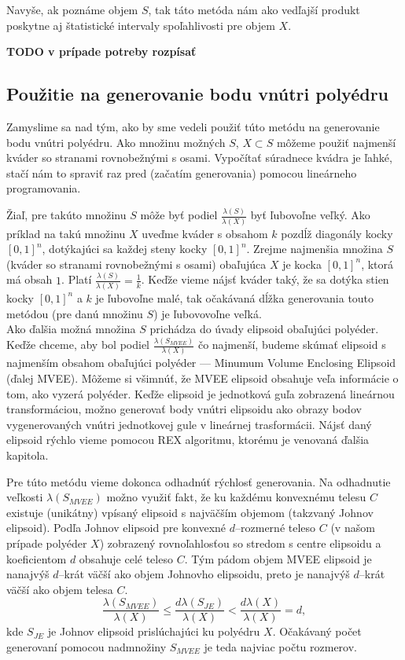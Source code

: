 Navyše, ak poznáme objem $S$, tak táto metóda nám ako vedľajší produkt poskytne aj štatistické intervaly spoľahlivosti pre objem $X$.

\textbf{TODO v prípade potreby rozpísať}

\subsection{Použitie na generovanie bodu vnútri polyédru}

Zamyslime sa nad tým, ako by sme vedeli použiť túto metódu na generovanie bodu vnútri polyédru. Ako množinu možných $S$, $X \subset S$ môžeme použiť najmenší kváder so stranami rovnobežnými s osami. Vypočítať súradnece kvádra je ľahké, stačí nám to spraviť raz pred (začatím generovania) pomocou lineárneho programovania.

Žiaľ, pre takúto množinu $S$ môže byť podiel $\frac{\lambda(S)}{\lambda(X)}$ byť ľubovoľne veľký. Ako príklad na takú množinu $X$ uveďme kváder s obsahom $k$ pozdĺž diagonály kocky $[0,1]^n$, dotýkajúci sa každej steny kocky $[0,1]^n$. Zrejme najmenšia množina $S$ (kváder so stranami rovnobežnými s osami) obaľujúca $X$ je kocka $[0,1]^n$, ktorá má obsah $1$. Platí $\frac{\lambda(S)}{\lambda(X)}=\frac{1}{k}$. Keďže vieme nájsť kváder taký, že sa dotýka stien kocky $[0,1]^n$ a $k$ je ľubovoľne malé, tak očakávaná dĺžka generovania touto metódou (pre danú množinu $S$) je ľubovovoľne veľká.\\

Ako ďalšia možná množina $S$ prichádza do úvady elipsoid obaľujúci polyéder. Keďže chceme, aby bol podiel $\frac{\lambda(S_{MVEE})}{\lambda(X)}$ čo najmenší, budeme skúmať elipsoid s najmenším obsahom obaľujúci polyéder --- Minumum Volume Enclosing Elipsoid (ďalej MVEE). Môžeme si všimnúť, že MVEE elipsoid obsahuje veľa informácie o tom, ako vyzerá polyéder. Keďže elipsoid je jednotková guľa zobrazená lineárnou transformáciou, možno generovať body vnútri elipsoidu ako obrazy bodov vygenerovaných vnútri jednotkovej gule v lineárnej trasformácii. Nájsť daný elipsoid rýchlo vieme pomocou REX algoritmu, ktorému je venovaná ďalšia kapitola.

Pre túto metódu vieme dokonca odhadnúť rýchlosť generovania. Na odhadnutie veľkosti $\lambda(S_{MVEE})$ možno využiť fakt, že ku každému konvexnému telesu $C$ existuje (unikátny) vpísaný elipsoid s najväčším objemom (takzvaný Johnov elipsoid). Podľa \cite{ellipsoids_ball} Johnov elipsoid pre konvexné $d$--rozmerné teleso $C$ (v našom prípade polyéder $X$) zobrazený rovnoľahlosťou so stredom s centre elipsoidu a koeficientom $d$ obsahuje celé teleso $C$. Tým pádom objem MVEE elipsoid je nanajvýš $d$--krát väčší ako objem Johnovho elipsoidu, preto je nanajvýš $d$--krát väčší ako objem telesa $C$.
$$\frac {\lambda(S_{MVEE})}{\lambda(X)} \leq \frac{d\lambda(S_{JE})}{\lambda(X)} < \frac{d\lambda(X)}{\lambda(X)}=d,$$ kde $S_{JE}$ je Johnov elipsoid prislúchajúci ku polyédru $X$. Očakávaný počet generovaní pomocou nadmnožiny $S_{MVEE}$ je teda najviac počtu rozmerov.\\

